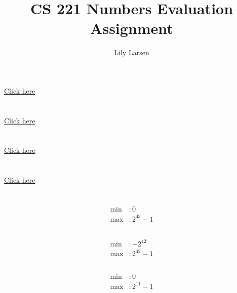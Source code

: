\documentclass{article}
\title{CS 221 Numbers Evaluation Assignment}
\author{Lily Larsen}
\begin{document}
\maketitle
\newpage

\section{}
\href{https://github.com/Id405/cs-221-eval-assignments/blob/main/eval-2/1.c}{Click here}
\newpage

\section{}
\href{https://github.com/Id405/cs-221-eval-assignments/blob/main/eval-2/2.c}{Click here}
\newpage

\section{}
\href{https://github.com/Id405/cs-221-eval-assignments/blob/main/eval-2/3.c}{Click here}
\newpage

\section{}
\href{https://github.com/Id405/cs-221-eval-assignments/blob/main/eval-2/4.c}{Click here}
\newpage

\section{}
\subsection{}
\begin{align*}
    \text{min}&: 0 \\
    \text{max}&: 2^{43} - 1
\end{align*}
\subsection{}
\begin{align*}
    \text{min}&: -2^{42} \\
    \text{max}&: 2^{42} - 1
\end{align*}
\subsection{}
\begin{align*}
    \text{min}&: 0 \\
    \text{max}&: 2^{11} - 1
\end{align*}
\end{document}
